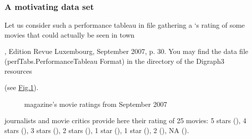 \documentclass[a4paper,12pt,english]{sphinxhowto}
\let\sphinxpxdimen\pdfpxdimen\else\newdimen\sphinxpxdimen
\begin{document}
\subsubsection{A motivating data set}
\label{\detokenize{pearls:a-motivating-data-set}}
\sphinxAtStartPar
Let us consider such a performance tableau in file  gathering a  ‘s rating of some movies that could actually be seen in town %
\begin{footnote}[1]\sphinxAtStartFootnote
{}, Edition Revue Luxembourg, September 2007, p. 30. You may find the data file  (perfTabs.PerformanceTableau Format) in the  directory of the Digraph3 resources
%
\end{footnote} (see \hyperref[\detokenize{pearls:graffiti07-1}]{Fig.\@ \ref{\detokenize{pearls:graffiti07-1}}}).

\begin{sphinxVerbatim}[commandchars=\\\{\},numbers=left,firstnumber=1,stepnumber=1]
 
  
                             
\end{sphinxVerbatim}

\begin{figure}[H]
\centering
\capstart

\noindent\sphinxincludegraphics[width=500\sphinxpxdimen]{{graffiti07_1}.png}
\caption{ magazine’s movie ratings from September 2007}\label{\detokenize{pearls:graffiti07-1}}\end{figure}

 journalists and movie critics provide here their rating of 25 movies: 5 stars (), 4 stars (), 3 stars (), 2 stars (), 1 star (), \sphinxhyphen{}1 star (), \sphinxhyphen{}2 (), NA ().
\end{document}
